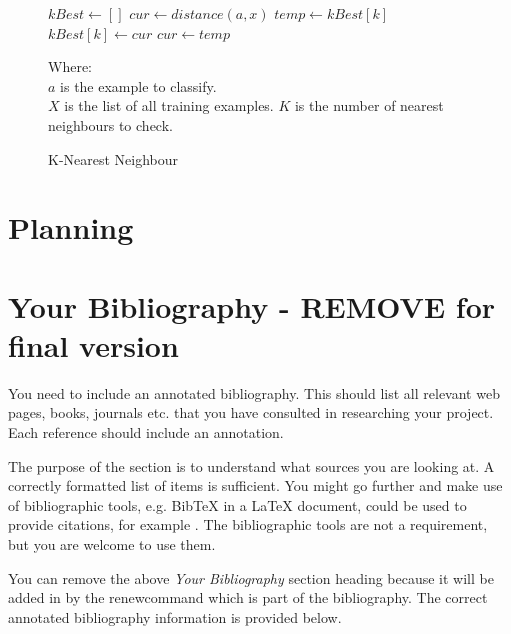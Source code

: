 \documentclass[11pt,fleqn,twoside]{article}
\begin{document}
\begin{figure}
\begin{algorithmic}
\State $kBest \gets []$
	\State $cur \gets distance(a, x)$
			\State $temp \gets kBest[k]$
			\State $kBest[k] \gets cur$
			\State $cur \gets temp$
		\EndIf
	\EndFor
\EndFor
\end{algorithmic}
Where:\\
$a$ is the example to classify.\\
$X$ is the list of all training examples.
$K$ is the number of nearest neighbours to check.
\caption{K-Nearest Neighbour}
\label{fig:k-nn}
\end{figure}

\section{Planning}

%
%
\section*{Your Bibliography - REMOVE for final version}
%
You need to include an annotated bibliography. This should list all relevant web pages, books, journals etc. that you have consulted in researching your project. Each reference should include an annotation. 

The purpose of the section is to understand what sources you are looking at.  A correctly formatted list of items is sufficient. You might go further and make use of bibliographic tools, e.g. BibTeX in a LaTeX document, could be used to provide citations, for example \cite{NumericalRecipes} \cite{MarksPaper} \cite[99-101]{FailBlog} \cite{kittenpic_ref}.  The bibliographic tools are not a requirement, but you are welcome to use them.   

You can remove the above {\em Your Bibliography} section heading because it will be added in by the renewcommand which is part of the bibliography. The correct annotated bibliography information is provided below. 
%
%
\end{document}
